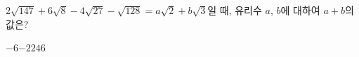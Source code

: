 $2\sqrt{147}+6\sqrt{8}-4\sqrt{27}-\sqrt{128}=a\sqrt{2}+b\sqrt{3}$일 때, 유리수 $a$, $b$에 대하여 $a+b$의 값은?
\begin{choices32}{$-6$}{$-2$}{$2$}{$4$}{$6$}\end{choices32}
